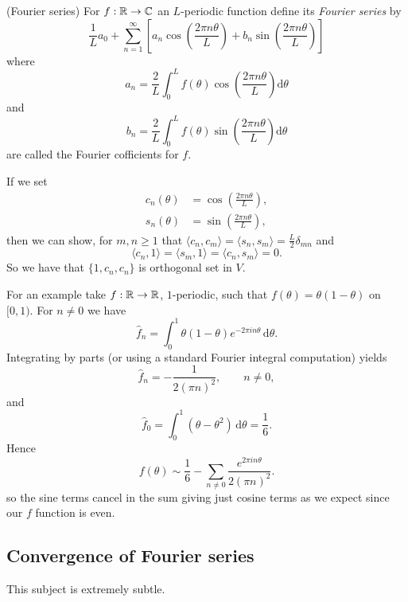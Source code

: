 \documentclass{article}
\begin{document}
\begin{definition}
	(Fourier series) For $ f: \mathbb{R}\to \mathbb{C} $ an $ L $-periodic function define its \textit{Fourier series} by
	\[
		\frac 1L a_0+\sum_{n=1}^\infty\left[a_n\cos\left(\frac{2\pi n\theta}L\right)+b_n\sin\left(\frac{2\pi n\theta}L\right)\right]
	\]
	where
	\[
		a_n=\frac 2L\int^L_0f(\theta)\cos\left(\frac{2\pi n\theta}L\right)\mathrm d\theta
	\]
	and
	\[
		b_n=\frac 2L\int^L_0f(\theta)\sin\left(\frac{2\pi n\theta}L\right)\mathrm d\theta
	\]
	are called the Fourier cofficients for $ f $.
\end{definition}
If we set
\begin{align*}
c_n(\theta) &= \cos\left(\frac{2\pi n\theta}{L}\right),\\
s_n(\theta) &= \sin\left(\frac{2\pi n\theta}{L}\right),
\end{align*}
then we can show, for $ m,n\ge 1 $ that $ \langle c_n,c_m\rangle=\langle s_n, s_m\rangle =\frac L2 \delta_{mn} $ and
\[
  \langle c_n,1\rangle = \langle s_m,1\rangle = \langle c_n, s_m \rangle = 0.
\]
So we have that $ \{1,c_n,c_n\} $ is orthogonal set in $ V $.\par
For an example take $ f:\mathbb{R}\to \mathbb{R} $, $1$-periodic, such that $ f(\theta)=\theta(1-\theta)$ on $[0,1)$. For $n\neq 0$ we have
\[
\hat f_n = \int_0^1 \theta(1-\theta)e^{-2\pi i n\theta}\,\mathrm d\theta.
\]
Integrating by parts (or using a standard Fourier integral computation) yields
\[
\hat f_n = -\frac{1}{2(\pi n)^2},\qquad n\neq 0,
\]
and
\[
\hat f_0 = \int_0^1 (\theta-\theta^2)\,\mathrm d\theta = \frac{1}{6}.
\]
Hence
\[
f(\theta) \sim \frac{1}{6} - \sum_{n\neq 0}\frac{e^{2\pi i n\theta}}{2(\pi n)^2}.
\]
so the sine terms cancel in the sum giving just cosine terms as we expect since our $ f $ function is even.
\subsection{Convergence of Fourier series}
This subject is extremely subtle.
\end{document}
